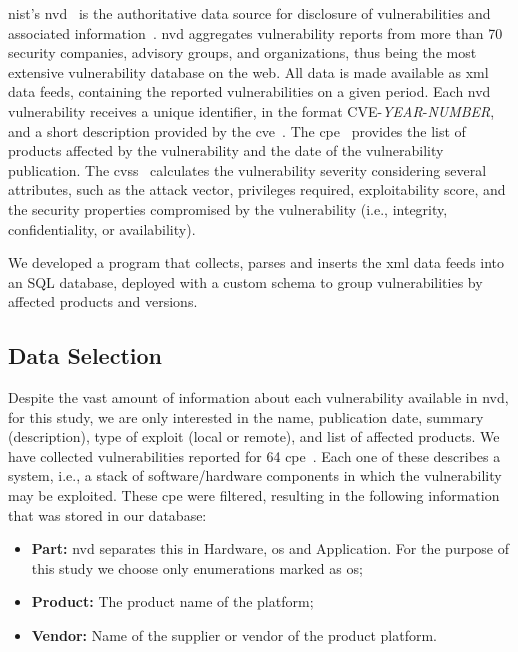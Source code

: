 \gls{nist}'s \gls{nvd}~\cite{nvd} is the authoritative data source for disclosure of vulnerabilities and associated information~\cite{Massacci:2010}. 
\gls{nvd} aggregates vulnerability reports from more than 70 security companies, advisory groups, and organizations, thus being the most extensive vulnerability database on the web. 
All data is made available as \gls{xml} data feeds, containing the reported vulnerabilities on a given period. 
Each \gls{nvd} vulnerability receives a unique identifier, in the format CVE-\textit{YEAR}-\textit{NUMBER}, and a short description provided by the \gls{cve}~\cite{cveterm}. 
The \gls{cpe}~\cite{cpe} provides the list of products affected by the vulnerability and the date of the vulnerability publication.
The \gls{cvss}~\cite{cvss} calculates the vulnerability severity considering several attributes, such as the attack vector, privileges required, exploitability score, and the security properties compromised by the vulnerability (i.e., integrity, confidentiality, or availability).


We developed a program that collects, parses and inserts the \gls{xml} data feeds into an SQL database, deployed with a custom schema to group vulnerabilities by affected products and versions.

\subsection{Data Selection}
Despite the vast amount of information about each vulnerability available in \gls{nvd}, for this study, we are only interested in the name, publication date, summary (description), type of exploit (local or remote), and list of affected products.
We have collected vulnerabilities reported for 64 \gls{cpe}~\cite{cpe}.
Each one of these describes a system, i.e., a stack of software/hardware components in which the vulnerability may be exploited.
These \gls{cpe} were filtered, resulting in the following information that was stored in our database:

\begin{itemize}
\item \textbf{Part:} \gls{nvd} separates this in Hardware, \gls{os} and Application. For the purpose of this study we choose only enumerations marked as \gls{os};
\item \textbf{Product:} The product name of the platform;
\item \textbf{Vendor:} Name of the supplier or vendor of the product platform.
\end{itemize}


